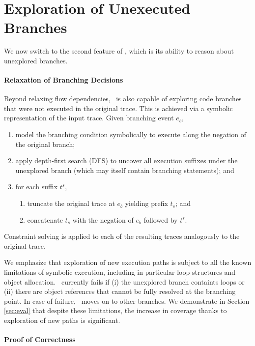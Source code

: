 \section{Exploration of Unexecuted Branches}

We now switch to the second feature of \tool, which is its ability to reason about unexplored branches.

\paragraph{Relaxation of Branching Decisions}

Beyond relaxing flow dependencies, \tool\ is also capable of exploring code branches that were not executed in the original trace. This is achieved via a symbolic representation of the input trace. Given branching event $e_b$,
\begin{enumerate}
	\item model the branching condition symbolically to execute along the negation of the original branch;
	\item apply depth-first search (DFS) to uncover all execution suffixes under the unexplored branch (which may itself contain branching statements); and
	\item for each suffix $t^s$,
	\begin{enumerate}
		\item truncate the original trace at $e_b$ yielding prefix $t_s$; and
		\item concatenate $t_s$ with the negation of $e_b$ followed by $t^s$.
	\end{enumerate}
\end{enumerate}
Constraint solving is applied to each of the resulting traces analogously to the original trace.

We emphasize that exploration of new execution paths is subject to all the known limitations of symbolic execution, including in particular loop structures and object allocation. \tool\ currently fails if (i) the unexplored branch containts loops or (ii) there are object references that cannot be fully resolved at the branching point. In case of failure, \tool\ moves on to other branches. We demonstrate in Section \ref{sec:eval} that despite these limitations, the increase in coverage thanks to exploration of new paths is significant.

\paragraph{Proof of Correctness}


